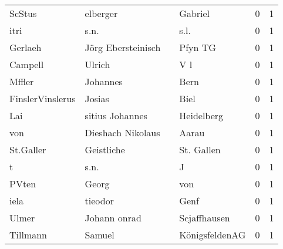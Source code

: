 \begin{tabular}{llllrr}
                   ScStus &                           elberger &             &                                     Gabriel &          0 &         1 \\
                     itri &                               s.n. &             &                                        s.l. &          0 &         1 \\
                  Gerlaeh &                 Jörg Ebersteinisch &             &                                     Pfyn TG &          0 &         1 \\
                  Campell &                             Ulrich &             &                                         V l &          0 &         1 \\
                   Mffler &                           Johannes &             &                                        Bern &          0 &         1 \\
         FinslerVinslerus &                             Josias &             &                                        Biel &          0 &         1 \\
                      Lai &                    sitius Johannes &             &                                  Heidelberg &          0 &         1 \\
                      von &                  Dieshach Nikolaus &             &                                       Aarau &          0 &         1 \\
                St.Galler &                         Geistliche &             &                                  St. Gallen &          0 &         1 \\
                        t &                               s.n. &             &                                           J &          0 &         1 \\
                    PVten &                              Georg &             &                                         von &          0 &         1 \\
                     iela &                            tieodor &             &                                        Genf &          0 &         1 \\
                    Ulmer &                       Johann onrad &             &                                Scjaffhausen &          0 &         1 \\
                 Tillmann &                             Samuel &             &                              KönigsfeldenAG &          0 &         1 \\

\end{tabular}
